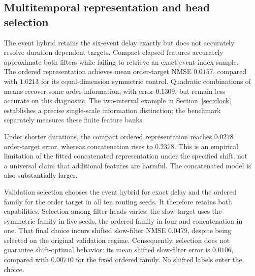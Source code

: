 \documentclass[11pt,a4paper]{article}
\theoremstyle{definition}\newtheorem{definition}[theorem]{Definition}
\begin{document}
\subsection{Multitemporal representation and head selection}
\begin{table}[!htbp]\centering\scriptsize
\caption{Irregular-duration test NMSE on fresh seeds 60--69, before the duration shift. Entries are mean $\pm$ sample standard deviation. Selected heads choose among the five preceding families using validation data only.}
\label{tab:multitime}
\end{table}
The event hybrid retains the six-event delay exactly but does not accurately resolve duration-dependent targets. Compact elapsed features accurately approximate both filters while failing to retrieve an exact event-index sample. The ordered representation achieves mean order-target NMSE $0.0157$, compared with $1.0213$ for its equal-dimension symmetric control. Quadratic combinations of means recover some order information, with error $0.1309$, but remain less accurate on this diagnostic. The two-interval example in Section~\ref{sec:clock} establishes a precise single-scale information distinction; the benchmark separately measures these finite feature banks.

\begin{table}[!htbp]\centering\scriptsize
\caption{The same trained models on independent streams with shorter event durations. There is no retraining, normalization change or reselection. NMSE is normalized by each shifted target's variance.}
\label{tab:shift}
\end{table}
Under shorter durations, the compact ordered representation reaches $0.0278$ order-target error, whereas concatenation rises to $0.2378$. This is an empirical limitation of the fitted concatenated representation under the specified shift, not a universal claim that additional features are harmful. The concatenated model is also substantially larger.

Validation selection chooses the event hybrid for exact delay and the ordered family for the order target in all ten routing seeds. It therefore retains both capabilities. Selection among filter heads varies: the slow target uses the symmetric family in five seeds, the ordered family in four and concatenation in one. That final choice incurs shifted slow-filter NMSE $0.0479$, despite being selected on the original validation regime. Consequently, selection does not guarantee shift-optimal behavior: its mean shifted slow-filter error is $0.0106$, compared with $0.00710$ for the fixed ordered family. No shifted labels enter the choice.
\end{document}
